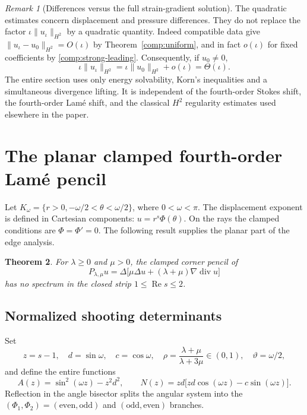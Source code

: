 \documentclass[11pt,a4paper]{article}
\newtheorem{theorem}{Theorem}[section]
\theoremstyle{remark}
\newtheorem{remark}[theorem]{Remark}
\numberwithin{equation}{section}
\begin{document}
\begin{remark}[Differences versus the full strain-gradient solution]
\label{comp:full-solution}
The quadratic estimates concern displacement and pressure differences.
They do not replace the factor $\iota\|u_\iota\|_{H^2}$ by a quadratic
quantity. Indeed compatible data give
$\|u_\iota-u_0\|_{H^2}=O(\iota)$ by
Theorem~\ref{comp:uniform}, and in fact $o(\iota)$ for fixed coefficients by
\eqref{comp:strong-leading}. Consequently, if $u_0\ne0$,
\[
 \iota\|u_\iota\|_{H^2}
 =\iota\|u_0\|_{H^2}+o(\iota)
 =\Theta(\iota).
\]
The entire section uses only energy solvability, Korn's inequalities and a
simultaneous divergence lifting. It is independent of the fourth-order
Stokes shift, the fourth-order Lam\'e shift, and the classical $H^2$
regularity estimates used elsewhere in the paper.
\end{remark}


\appendix

\section{The planar clamped fourth-order Lam\'e pencil}
\label{sec:planar-pencil20}

Let $K_\omega=\{r>0,-\omega/2<\theta<\omega/2\}$, where $0<\omega<\pi$.
The displacement exponent is defined in Cartesian components:
$u=r^s\Phi(\theta)$. On the rays the clamped conditions are
$\Phi=\Phi'=0$. The following result supplies the planar part of the edge
analysis.

\begin{theorem}\label{thm:planar-strip20}
For $\lambda\ge0$ and $\mu>0$, the clamped corner pencil of
\[
 P_{\lambda,\mu}u
 =\Delta\bigl[\mu\Delta u+(\lambda+\mu)\nabla\operatorname{div}u\bigr]
\]
has no spectrum in the closed strip $1\le\operatorname{Re}s\le2$.
\end{theorem}

\subsection{Normalized shooting determinants}

Set
\[
 z=s-1,\quad d=\sin\omega,\quad c=\cos\omega,\quad
 \rho=\frac{\lambda+\mu}{\lambda+3\mu}\in(0,1),\quad\vartheta=\omega/2,
\]
and define the entire functions
\begin{equation}\label{eq:planar-AN20}
 A(z)=\sin^2(\omega z)-z^2d^2,
 \qquad
 N(z)=zd\bigl[zd\cos(\omega z)-c\sin(\omega z)\bigr].
\end{equation}
Reflection in the angle bisector splits the angular system into the
$(\Phi_1,\Phi_2)=(\text{even},\text{odd})$ and
$(\text{odd},\text{even})$ branches.
\end{document}
